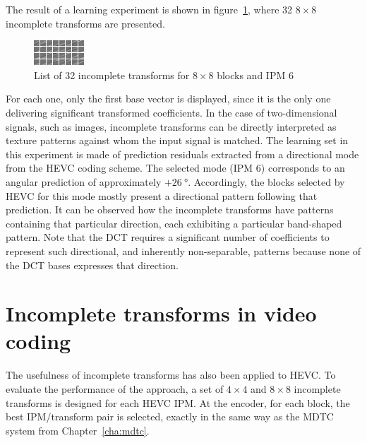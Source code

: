 \documentclass[11pt,a4paper,openright,twoside]{book}
\numberwithin{equation}{section} %
\numberwithin{figure}{section} %
\numberwithin{table}{section} %
\begin{document}
The result of a learning experiment is shown in
figure~\ref{fig:it_32_transforms}, where 32 $8\times8$ incomplete transforms
are presented.
\begin{figure}[tp]
	\centering
	\includegraphics[width=0.8\linewidth]{./figures/it_32_transforms.png}
	\caption{List of 32 incomplete transforms for $8\times8$ blocks and
	\acs{IPM} 6}
	\label{fig:it_32_transforms}
\end{figure}
For each one, only the first base vector is displayed, since it is the only
one delivering significant transformed coefficients.
In the case of two-dimensional signals, such as images, incomplete transforms can
be directly interpreted as texture patterns against whom the input signal is
matched.
The learning set in this experiment is made of prediction residuals extracted
from a directional mode from the \ac{HEVC} coding scheme.
The selected mode (\ac{IPM} 6) corresponds to an angular prediction of
approximately $+\SI{26}{\degree}$.
Accordingly, the blocks selected by \ac{HEVC} for this mode mostly present a
directional pattern following that prediction.
It can be observed how the incomplete transforms have patterns containing that
particular direction, each exhibiting a particular band-shaped pattern.
Note that the \ac{DCT} requires a significant number of coefficients to
represent such directional, and inherently non-separable, patterns because
none of the \ac{DCT} bases expresses that direction.

\section{Incomplete transforms in video coding}
\label{sec:it_video_coding}

The usefulness of incomplete transforms has also been applied to \ac{HEVC}.
To evaluate the performance of the approach, a set of $4\times4$ and
$8\times8$ incomplete transforms is designed for each \ac{HEVC} \ac{IPM}.
At the encoder, for each block, the best \ac{IPM}/transform pair is selected,
exactly in the same way as the \ac{MDTC} system from Chapter~\ref{cha:mdtc}.
\end{document}
